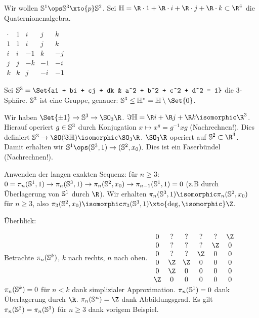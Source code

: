 \begin{ex}
    Wir wollen $\S^1 \ops \S^3 \xto{p} \S^2$.
    Sei $\H = \R \cdot 1 + \R \cdot i + \R \cdot j + \R \cdot k \subset \R^4$ die Quaternionenalgebra.
    \begin{table}[ht]
        \centering
        $\begin{array}{c|cccc}
            \cdot & 1 & i & j & k \\ \hline
            1 & 1 & i & j & k \\
            i & i & -1 & k & -j \\
            j & j & -k & -1 & -i \\
            k & k & j & -i & -1
        \end{array}$
    \end{table}
    Sei $\S^3 = \Set{a1 + bi + cj + dk & a^2 + b^2 + c^2 + d^2 = 1}$ die 3-Sphäre.
    $\S^3$ ist eine Gruppe, genauer: $\S^3 \le \H^* = \H \setminus \Set{0}$.

    Wir haben $\Set{\pm 1} \to \S^3 \to \SO_3\R$.
    $\Im \H = \R i + \R j + \R k \isomorphic \R^3$.
    Hierauf operiert $g \in \S^3$ durch Konjugation $x \mapsto x^g = g^{-1} x g$ (Nachrechnen!).
    Dies definiert $\S^3 \to \SO(\Im \H) \isomorphic \SO_3 \R$.
    $\SO_3 \R$ operiert auf $\S^2 \subset \R^3$.
    Damit erhalten wir
    \begin{math}
        \S^1 \ops (\S^3, 1) \to (\S^2, x_0).
    \end{math}
    Dies ist ein Faserbündel (Nachrechnen!).

    Anwenden der langen exakten Sequenz: für $n \ge 3$:
    \begin{math}
        0 = \pi_n(\S^1,1) \to \pi_n(\S^3,1) \to \pi_n(\S^2,x_0) \to \pi_{n-1}(\S^1, 1) = 0
    \end{math}
    (z.B durch Überlagerung von $\S^1$ durch $\R$).
    Wir erhalten $\pi_n(\S^3,1) \isomorphic \pi_n(\S^2,x_0)$ für $n \ge 3$, also
    \begin{math}
        \pi_3(\S^2, x_0) \isomorphic \pi_3(\S^3,1) \xto{\mathrm{deg},\isomorphic} \Z.
    \end{math}
\end{ex}

Überblick:

Betrachte $\pi_n(\S^k)$, $k$ nach rechts, $n$ nach oben.
\begin{math}
    \begin{array}{cccccc}
        0 & ? & ? & ? & ? & \Z \\
        0 & ? & ? & ? & \Z & 0 \\
        0 & ? & ? & \Z & 0 & 0 \\
        0 & \Z & \Z & 0 & 0 & 0 \\
        0 & \Z & 0 & 0 & 0 & 0 \\
        \Z & 0 & 0 & 0 & 0 & 0
    \end{array}
\end{math}
$\pi_n(\S^k) = 0$ für $n < k$ dank simplizialer Approximation.
$\pi_n(\S^1) = 0$ dank Überlagerung durch $\R$.
$\pi_n(\S^n) = \Z$ dank Abbildungsgrad.
Es gilt $\pi_n(\S^2) = \pi_n(\S^3)$ für $n \ge 3$ dank vorigem Beispiel.

